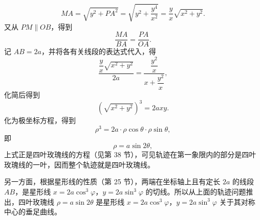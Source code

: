 \[
  MA = \sqrt{y^2 + PA^2} = \sqrt{y^2 + \frac{y^4}{x^2}} = \frac{y}{x}\sqrt{x^2 + y^2}.
\]
又从 $PM \parallel OB$，得到
\[
  \frac{MA}{BA} = \frac{PA}{OA}.
\]
记 $AB = 2a$，并将各有关线段的表达式代入，得
\[
  \frac{\dfrac{y}{x}\sqrt{x^2+y^2}}{2a} = \frac{\dfrac{y^2}{x}}{x + \dfrac{y^2}{x}},
\]
化简后得到
\[
  (\sqrt{x^2+y^2})^3 = 2axy.
\]
化为极坐标方程，得到
\[
  \rho^3 = 2a\cdot\rho\cos\theta\cdot\rho\sin\theta,
\]
即
\[
  \rho = a\sin 2\theta,
\]
上式正是四叶玫瑰线的方程（见第 38 节），可见轨迹在第一象限内的部分是四叶玫瑰线的一叶，因而整个轨迹就是四叶玫瑰线。

另一方面，根据星形线的性质（第 25 节），两端在坐标轴上且有定长 $2a$ 的线段 $AB$，是星形线 $x=2a\cos^3\varphi$，$y=2a\sin^3\varphi$ 的切线。所以从上面的轨迹问题推出，四叶玫瑰线 $\rho = a\sin 2\theta$ 是星形线 $x=2a\cos^3\varphi$，$y=2a\sin^3\varphi$ 关于其对称中心的垂足曲线。
